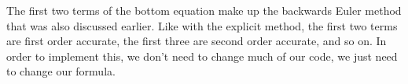 The first two terms of the bottom equation make up the backwards Euler method that was also discussed earlier. Like with the explicit method, the first two terms are first order accurate, the first three are second order accurate, and so on. In order to implement this, we don't need to change much of our code, we just need to change our formula.